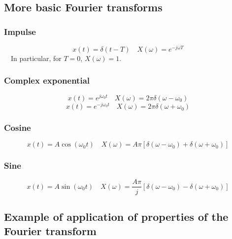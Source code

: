 \subsection{More basic Fourier transforms}

\subsubsection{Impulse}
\[ x(t)=\delta(t-T) \quad X(\omega)=e^{-j\omega T} \]
\ \ In particular, for $T=0$, $X(\omega)=1$.

\subsubsection{Complex exponential}
\[ x(t)=e^{j\omega_{0}t} \quad X(\omega)=2\pi \delta(\omega-\omega_{0}) \]
\[ x(t)=e^{-j\omega_{0}t} \quad X(\omega)=2\pi \delta(\omega+\omega_{0}) \]

\subsubsection{Cosine}
\[ x(t)=A\cos(\omega_{0} t)\quad X(\omega)=A\pi[ \delta(\omega-\omega_{0})+ \delta(\omega+\omega_{0})] \]

\subsubsection{Sine}
\[ x(t)=A\sin(\omega_{0} t)\quad X(\omega)=\frac{A \pi}{j}[ \delta(\omega-\omega_{0})- \delta(\omega+\omega_{0})] \]

\subsection{Example of application of properties of the Fourier transform}

